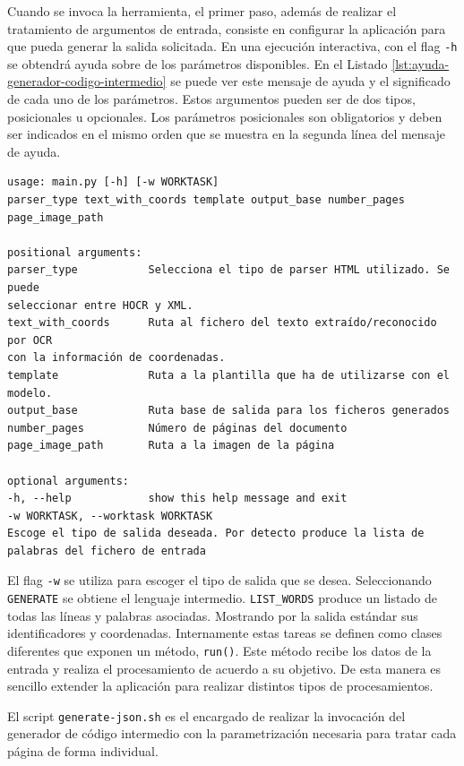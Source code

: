 Cuando se invoca la herramienta, el primer paso, además de realizar el tratamiento de argumentos de entrada, consiste en configurar la aplicación para que pueda generar la salida solicitada. En una ejecución interactiva, con el flag \verb|-h| se obtendrá ayuda sobre de los parámetros disponibles. En el Listado \ref{lst:ayuda-generador-codigo-intermedio} se puede ver este mensaje de ayuda y el significado de cada uno de los parámetros. Estos argumentos pueden ser de dos tipos, posicionales u opcionales. Los parámetros posicionales son obligatorios y deben ser indicados en el mismo orden que se muestra en la segunda línea del mensaje de ayuda. 

\begin{lstlisting}[caption={Ayuda del generador de código intermedio},label=lst:ayuda-generador-codigo-intermedio]
usage: main.py [-h] [-w WORKTASK]
parser_type text_with_coords template output_base number_pages page_image_path

positional arguments:
parser_type           Selecciona el tipo de parser HTML utilizado. Se puede
seleccionar entre HOCR y XML.
text_with_coords      Ruta al fichero del texto extraído/reconocido por OCR
con la información de coordenadas.
template              Ruta a la plantilla que ha de utilizarse con el
modelo.
output_base           Ruta base de salida para los ficheros generados
number_pages          Número de páginas del documento
page_image_path       Ruta a la imagen de la página

optional arguments:
-h, --help            show this help message and exit
-w WORKTASK, --worktask WORKTASK
Escoge el tipo de salida deseada. Por detecto produce la lista de palabras del fichero de entrada
\end{lstlisting}

El flag \verb|-w| se utiliza para escoger el tipo de salida que se desea. Seleccionando \verb|GENERATE| se obtiene el lenguaje intermedio. \verb|LIST_WORDS| produce un listado de todas las líneas y palabras asociadas. Mostrando por la salida estándar sus identificadores y coordenadas. Internamente estas tareas se definen como clases diferentes que exponen un método, \verb|run()|. Este método recibe los datos de la entrada y realiza el procesamiento de acuerdo a su objetivo. De esta manera es sencillo extender la aplicación para realizar distintos tipos de procesamientos.

El script \verb|generate-json.sh| es el encargado de realizar la invocación del generador de código intermedio con la parametrización necesaria para tratar cada página de forma individual.

